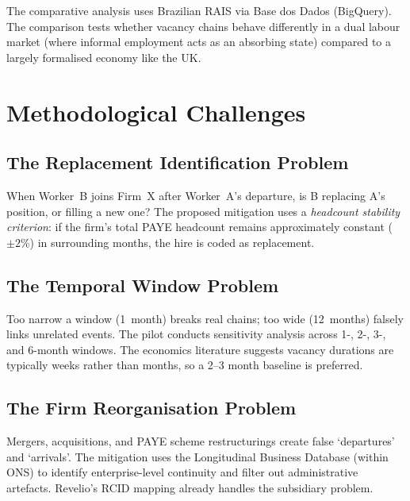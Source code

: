\documentclass[a4paper]{tufte-handout}
\begin{document}
The comparative analysis uses Brazilian RAIS via Base dos Dados (BigQuery).
The comparison tests whether vacancy chains behave differently in a dual labour market (where informal employment acts as an absorbing state) compared to a largely formalised economy like the UK\@.


\section{Methodological Challenges}

\subsection{The Replacement Identification Problem}
When Worker~B joins Firm~X after Worker~A's departure, is B replacing A's position, or filling a new one? The proposed mitigation uses a \emph{headcount stability criterion}: if the firm's total PAYE headcount remains approximately constant (${\pm}2\%$) in surrounding months, the hire is coded as replacement.

\subsection{The Temporal Window Problem}
Too narrow a window (1~month) breaks real chains; too wide (12~months) falsely links unrelated events. The pilot conducts sensitivity analysis across 1-, 2-, 3-, and 6-month windows. The economics literature suggests vacancy durations are typically weeks rather than months, so a 2--3 month baseline is preferred.

\subsection{The Firm Reorganisation Problem}
Mergers, acquisitions, and PAYE scheme restructurings create false `departures' and `arrivals'. The mitigation uses the Longitudinal Business Database (within ONS) to identify enterprise-level continuity and filter out administrative artefacts. Revelio's RCID mapping already handles the subsidiary problem.
\end{document}
